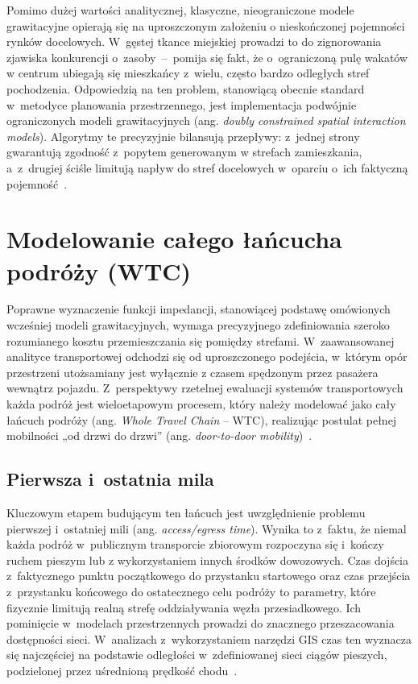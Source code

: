 \documentclass{pracamgr}
\begin{document}
Pomimo dużej wartości analitycznej, klasyczne, nieograniczone modele grawitacyjne opierają się na uproszczonym założeniu o nieskończonej pojemności rynków docelowych. W~gęstej tkance miejskiej prowadzi to do zignorowania zjawiska konkurencji o~zasoby~–~pomija się fakt, że o~ograniczoną pulę wakatów w centrum ubiegają się mieszkańcy z~wielu, często bardzo odległych stref pochodzenia. Odpowiedzią na ten problem, stanowiącą obecnie standard w~metodyce planowania przestrzennego, jest implementacja podwójnie ograniczonych modeli grawitacyjnych (ang. \textit{doubly constrained spatial interaction models}). Algorytmy te precyzyjnie bilansują przepływy: z~jednej strony gwarantują zgodność z~popytem generowanym w strefach zamieszkania, a~z~drugiej ściśle limitują napływ do stref docelowych w~oparciu o~ich faktyczną pojemność~\cite{gravity2}.


\section{Modelowanie całego łańcucha podróży (WTC)}\label{section:wtc}

Poprawne wyznaczenie funkcji impedancji, stanowiącej podstawę omówionych wcześniej modeli grawitacyjnych, wymaga precyzyjnego zdefiniowania szeroko rozumianego kosztu przemieszczania się pomiędzy strefami. W~zaawansowanej analityce transportowej odchodzi się od uproszczonego podejścia, w~którym opór przestrzeni utożsamiany jest wyłącznie z czasem spędzonym przez pasażera wewnątrz pojazdu. Z~perspektywy rzetelnej ewaluacji systemów transportowych każda podróż jest wieloetapowym procesem, który należy modelować jako cały łańcuch podróży (ang. \textit{Whole Travel Chain} – WTC), realizując postulat pełnej mobilności „od drzwi do drzwi” (ang. \textit{door-to-door mobility})~\cite{disabilities1}.

\subsection{Pierwsza i~ostatnia mila}\label{subsection:mila}
Kluczowym etapem budującym ten łańcuch jest uwzględnienie problemu pierwszej i~ostatniej mili (ang. \textit{access/egress time}). Wynika to z~faktu, że niemal każda podróż w~publicznym transporcie zbiorowym rozpoczyna się i~kończy ruchem pieszym lub z wykorzystaniem innych środków dowozowych. Czas dojścia z~faktycznego punktu początkowego do przystanku startowego oraz czas przejścia z~przystanku końcowego do ostatecznego celu podróży to parametry, które fizycznie limitują realną strefę oddziaływania węzła przesiadkowego. Ich pominięcie w~modelach przestrzennych prowadzi do znacznego przeszacowania dostępności sieci. W~analizach z~wykorzystaniem narzędzi GIS czas ten wyznacza się najczęściej na podstawie odległości w~zdefiniowanej sieci ciągów pieszych, podzielonej przez uśrednioną prędkość chodu~\cite{metropolitan, capetown}.
\end{document}
